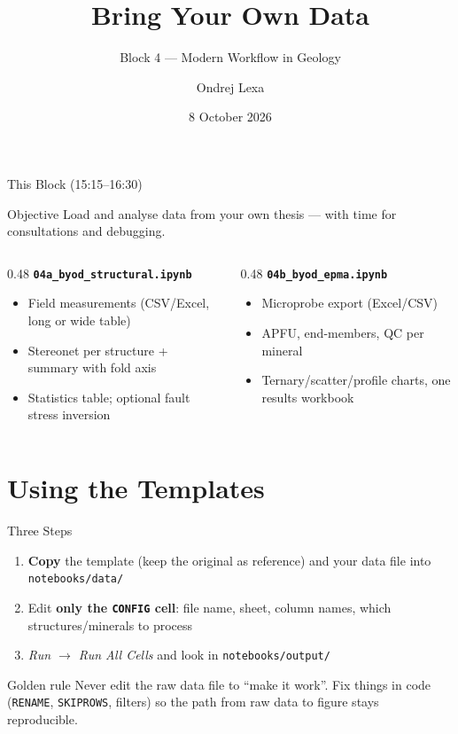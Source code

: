 \documentclass[aspectratio=169,11pt]{beamer}
\title[BYOD]{Bring Your Own Data}
\subtitle{Block 4 --- Modern Workflow in Geology}
\author[O.\ Lexa]{Ondrej Lexa}
\institute[Charles University]{
  Institute of Petrology and Structural Geology (IPSG)\\
  Charles University, Prague, Czechia
}
\date{8 October 2026}
\begin{document}
\begin{frame}[plain]
  \titlepage
\end{frame}

\begin{frame}{This Block (15:15--16:30)}
  \begin{block}{Objective}
    Load and analyse data from your own thesis --- with time for
    consultations and debugging.
  \end{block}
  \vspace{0.3cm}
  \begin{columns}[T]
    \begin{column}{0.48\textwidth}
      \textbf{\texttt{04a\_byod\_structural.ipynb}}
      \small
      \begin{itemize}
        \item Field measurements (CSV/Excel, long or wide table)
        \item Stereonet per structure + summary with fold axis
        \item Statistics table; optional fault stress inversion
      \end{itemize}
    \end{column}
    \begin{column}{0.48\textwidth}
      \textbf{\texttt{04b\_byod\_epma.ipynb}}
      \small
      \begin{itemize}
        \item Microprobe export (Excel/CSV)
        \item APFU, end-members, QC per mineral
        \item Ternary/scatter/profile charts, one results workbook
      \end{itemize}
    \end{column}
  \end{columns}
\end{frame}

\section{Using the Templates}

\begin{frame}{Three Steps}
  \begin{enumerate}
    \item \textbf{Copy} the template (keep the original as reference) and your data
          file into \texttt{notebooks/data/}
    \item Edit \textbf{only the \texttt{CONFIG} cell}: file name, sheet, column names,
          which structures/minerals to process
    \item \emph{Run $\rightarrow$ Run All Cells} and look in \texttt{notebooks/output/}
  \end{enumerate}
  \vspace{0.4cm}
  \begin{alertblock}{Golden rule}
    Never edit the raw data file to ``make it work''. Fix things in code
    (\texttt{RENAME}, \texttt{SKIPROWS}, filters) so the path from raw data to
    figure stays reproducible.
  \end{alertblock}
\end{frame}
\end{document}
